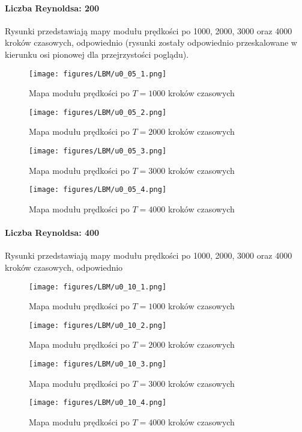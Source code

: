\documentclass[12pt]{article}
\begin{document}
\paragraph{Liczba Reynoldsa: 200}
Rysunki przedstawiają mapy modułu prędkości po 1000, 2000, 3000 oraz 4000 kroków czasowych, odpowiednio (rysunki zostały odpowiednio przeskalowane w kierunku osi pionowej dla przejrzystości poglądu).
\begin{figure}[H]
	\texttt{[image: figures/LBM/u0\_05\_1.png]} 
	\caption{Mapa modułu prędkości po $ T=1000 $ kroków czasowych}
\end{figure}
\begin{figure}[H]
	\texttt{[image: figures/LBM/u0\_05\_2.png]} 
	\caption{Mapa modułu prędkości po $ T=2000 $ kroków czasowych}
\end{figure}
\begin{figure}[H]
	\texttt{[image: figures/LBM/u0\_05\_3.png]} 
	\caption{Mapa modułu prędkości po $ T=3000 $ kroków czasowych}
\end{figure}
\begin{figure}[H]
	\texttt{[image: figures/LBM/u0\_05\_4.png]} 
	\caption{Mapa modułu prędkości po $ T=4000 $ kroków czasowych}
\end{figure}
\paragraph{Liczba Reynoldsa: 400}
Rysunki przedstawiają mapy modułu prędkości po 1000, 2000, 3000 oraz 4000 kroków czasowych, odpowiednio 
\begin{figure}[H]
	\texttt{[image: figures/LBM/u0\_10\_1.png]} 
	\caption{Mapa modułu prędkości po $ T=1000 $ kroków czasowych}
\end{figure}
\begin{figure}[H]
	\texttt{[image: figures/LBM/u0\_10\_2.png]} 
	\caption{Mapa modułu prędkości po $ T=2000 $ kroków czasowych}
\end{figure}
\begin{figure}[H]
	\texttt{[image: figures/LBM/u0\_10\_3.png]} 
	\caption{Mapa modułu prędkości po $ T=3000 $ kroków czasowych}
\end{figure}
\begin{figure}[H]
	\texttt{[image: figures/LBM/u0\_10\_4.png]} 
	\caption{Mapa modułu prędkości po $ T=4000 $ kroków czasowych}
\end{figure}
\end{document}
